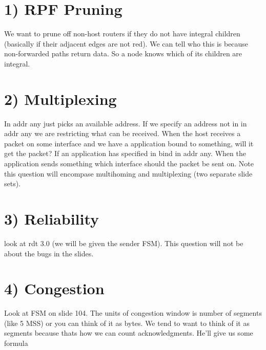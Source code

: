 \documentclass{article}
\begin{document}
\section{1) RPF Pruning} %
\label{sec:rpf_pruning}
We want to prune off non-host routers if they do not have integral children (basically if their adjacent edges are not red). We can tell who this is because non-forwarded paths return data. So a node knows which of its children are integral.

\section{2) Multiplexing} %
\label{sec:2_multiplexing}
In addr any just picks an available address. If we specify an address not in in addr any we are restricting what can be received. When the host receives a packet on some interface and we have a application bound to something, will it get the packet? If an application has specified in bind in addr any. When the application sends something which interface should the packet be sent on. Note this question will encompase multihoming and multiplexing (two separate slide sets).

\section{3) Reliability} %
\label{sec:3_reliability}
look at rdt 3.0 (we will be given the sender FSM). This question will not be about the bugs in the slides. 

\section{4) Congestion} %
\label{sec:4_congestion}
Look at FSM on slide 104. The units of congestion window is number of segments (like 5 MSS) or you can think of it as bytes. We tend to want to think of it as segments because thats how we can count acknowledgments. He'll give us some formula


\end{document}
